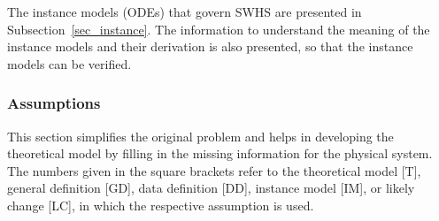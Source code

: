 \documentclass[12pt]{article}
\newcommand{\progname}{SWHS}
\begin{document}
The instance models (ODEs) that govern \progname{} are presented in
Subsection~\ref{sec_instance}.  The information to understand the meaning of the
instance models and their derivation is also presented, so that the instance
models can be verified.

\subsubsection{Assumptions}

This section simplifies the original problem and helps in developing the
theoretical model by filling in the missing information for the physical
system. The numbers given in the square brackets refer to the theoretical model
[T], general definition [GD], data definition [DD], instance model [IM], or
likely change [LC], in which the respective assumption is used.
\end{document}
